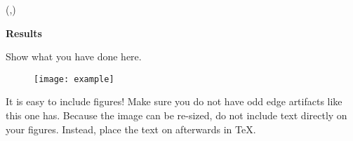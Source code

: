 \documentclass[dark]{cgem-poster}
\begin{document}
  \begin{textblock*}{\PosterColumnTwoTextWidth{}}(\PosterColumnTwoTextLeft{},\PosterColumnTwoTextTop{})
    \begin{minipage}[t][\PosterColumnTwoTextHeight{}][t]{\PosterColumnTwoTextWidth{}}
      \vspace{5mm}
      \begin{center}
        \large
        \textbf{Results}
      \end{center}

      \vspace{5mm}
      \small
      Show what you have done here.

      \vspace{20cm}
      \begin{figure}
        \centering
        \texttt{[image: example]}
      \end{figure}

      \vspace{1cm}
      It is easy to include figures! %
      Make sure you do not have odd edge artifacts like this one has. %
      Because the image can be re-sized, do not include text directly on your figures. %
      Instead, place the text on afterwards in \TeX{}.

    \end{minipage}
  \end{textblock*}

  \newcommand{\PosterColumnThreeTextLeft}{\dimexpr (\PosterColumnThreeLeft + \PosterTextMarginSize)\relax}
  \newcommand{\PosterColumnThreeTextWidth}{\dimexpr (\PosterColumnThreeWidth - 2\PosterTextMarginSize)\relax}
  \newcommand{\PosterColumnThreeTextTop}{\dimexpr (\PosterColumnThreeTop + \PosterTextMarginSize)\relax}
  \newcommand{\PosterColumnThreeTextHeight}{\dimexpr (\PosterColumnThreeHeight - 2\PosterTextMarginSize)\relax}
\end{document}
